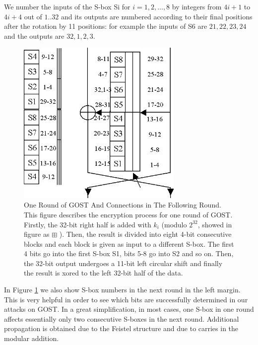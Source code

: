 We number the inputs of the S-box Si for $i=1,2,\ldots,8$ by integers from $4i+1$ to $4i+4$ out of $1..32$ and its outputs are numbered according to their final positions after the rotation by 11 positions: for example the inputs of S6 are $21,22,23,24$ and the outputs are $32,1,2,3$.


\begin{figure}[h] 
	\centering
	\includegraphics[width=80mm]{./pics/gostfeist2.jpg}
	
	\caption[One Round of GOST And Connections in The Following Round] {One Round of GOST And Connections in The Following Round. This figure describes the encryption process for one round of GOST. Firstly, the 32-bit right half is added with $k_{i}$ (modulo $2^{32}$, showed in figure as  $\boxplus$ ). Then, the result is divided into eight 4-bit consecutive blocks and each block is given as input to a different S-box. The first 4 bits go into the first S-box S1, bits 5-8 go into S2 and so on. Then, the 32-bit output undergoes a 11-bit left circular shift and finally the result is xored to the left 32-bit half of the data.}
	\label{GostRoundAndConnections}
\end{figure}

In Figure \ref{GostRoundAndConnections}
we also show S-box numbers
in the next round in the left margin.
This is very helpful in order to see which bits are successfully determined in our attacks on GOST.
In a great simplification, in most cases, one S-box in one round affects essentially
only two consecutive S-boxes in the next round. Additional propagation is obtained due to the Feistel structure
and due to carries in the modular addition.

